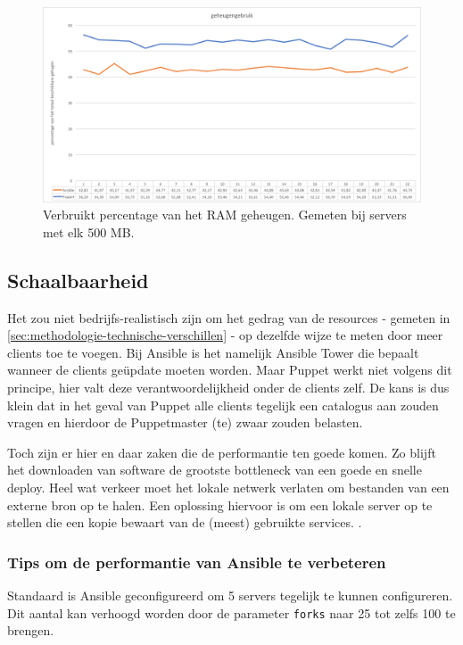 \begin{figure}
  \includegraphics[width=\linewidth]{img/geheugengebruik}
 \caption{Verbruikt percentage van het RAM geheugen. Gemeten bij servers met elk 500 MB. }  
  \label{fig:geheugengebruik}
\end{figure}


\subsection{Schaalbaarheid}
\label{sec:schaalbaarheid}


Het zou niet bedrijfs-realistisch zijn om het gedrag van de resources  - gemeten in \ref{sec:methodologie-technische-verschillen} - op dezelfde wijze te meten door meer clients toe te voegen. Bij Ansible is het namelijk Ansible Tower die bepaalt wanneer de clients ge\"update moeten worden. Maar Puppet werkt niet volgens dit principe, hier valt deze verantwoordelijkheid onder de clients zelf. De kans is dus klein dat in het geval van Puppet alle clients tegelijk een catalogus aan zouden vragen en hierdoor de Puppetmaster (te) zwaar zouden belasten.

 Toch zijn er hier en daar zaken die de performantie ten goede komen. Zo blijft het downloaden van software de grootste bottleneck van een goede en snelle deploy. Heel wat verkeer moet het lokale netwerk verlaten om bestanden van een externe bron op te halen. Een oplossing hiervoor is om een lokale server op te stellen die een kopie bewaart van de (meest) gebruikte services. \autocite{AnsibleTuning}.
 
 \subsubsection{Tips om de performantie van Ansible te verbeteren}
 Standaard is Ansible geconfigureerd om 5 servers tegelijk te kunnen configureren. Dit aantal kan verhoogd worden door de parameter \texttt{\gls{fork}s} naar 25 tot zelfs 100 te brengen. 
 
